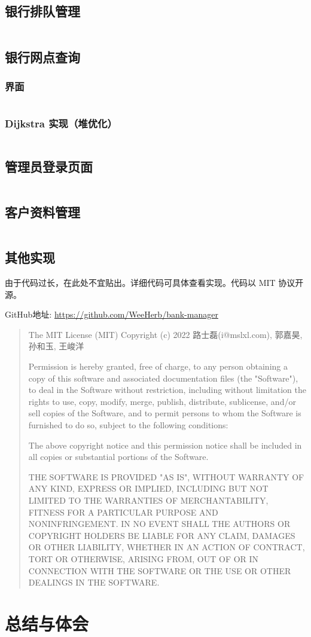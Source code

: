\documentclass{ctexrep}
\begin{document}
\section{银行排队管理}
\inputminted{cpp}{../src/core/page/bank_queue.cpp}
\section{银行网点查询}
\subsection{界面}
\inputminted{cpp}{../src/core/page/bank_map.cpp}
\subsection{Dijkstra 实现（堆优化）}
\inputminted{cpp}{../src/core/data/struct/graph.h}
\section{管理员登录页面}
\inputminted{cpp}{../src/core/page/login.cpp}
\section{客户资料管理}
\inputminted{cpp}{../src/core/data/Database.cpp}

\section{其他实现}
由于代码过长，在此处不宜贴出。详细代码可具体查看实现。代码以 MIT 协议开源。

GitHub地址: \href{https://github.com/WeeHerb/bank-manager}{https://github.com/WeeHerb/bank-manager}

\begin{quotation}
  The MIT License (MIT)
  Copyright (c) 2022 路士磊(i@mslxl.com), 郭嘉昊, 孙和玉, 王峻洋

  Permission is hereby granted, free of charge, to any person obtaining a copy
  of this software and associated documentation files (the "Software"), to deal
  in the Software without restriction, including without limitation the rights
  to use, copy, modify, merge, publish, distribute, sublicense, and/or sell
  copies of the Software, and to permit persons to whom the Software is
  furnished to do so, subject to the following conditions:

  The above copyright notice and this permission notice shall be included in all
  copies or substantial portions of the Software.

  THE SOFTWARE IS PROVIDED "AS IS", WITHOUT WARRANTY OF ANY KIND,
  EXPRESS OR IMPLIED, INCLUDING BUT NOT LIMITED TO THE WARRANTIES OF
  MERCHANTABILITY, FITNESS FOR A PARTICULAR PURPOSE AND NONINFRINGEMENT.
  IN NO EVENT SHALL THE AUTHORS OR COPYRIGHT HOLDERS BE LIABLE FOR ANY CLAIM,
  DAMAGES OR OTHER LIABILITY, WHETHER IN AN ACTION OF CONTRACT, TORT OR
  OTHERWISE, ARISING FROM, OUT OF OR IN CONNECTION WITH THE SOFTWARE OR THE USE
  OR OTHER DEALINGS IN THE SOFTWARE.
\end{quotation}


\chapter{总结与体会}

\end{document}
